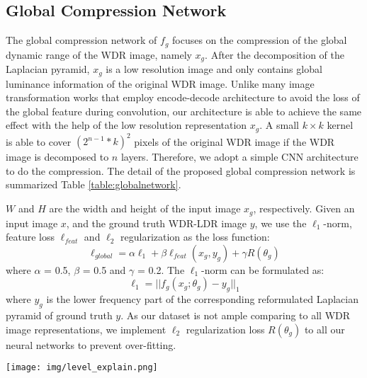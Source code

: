 \documentclass[journal]{IEEEtran}
\begin{document}
\subsection{Global Compression Network}
The global compression network of $f_g$ focuses on the compression of the global dynamic range of the WDR image, namely $x_g$. After the decomposition of the Laplacian pyramid, $x_g$ is a low resolution image and only contains global luminance information of the original WDR image. Unlike many image transformation works \cite{yang2018image,lee2018deep,cai2018learning} that employ encode-decode architecture to avoid the loss of the global feature during convolution, our architecture is able to achieve the same effect with the help of the low resolution representation $x_g$. A small $k \times k$ kernel is able to cover $(2^{n-1}*k)^2$ pixels of the original WDR image if the WDR image is decomposed to $n$ layers.
Therefore, we adopt a simple CNN architecture to do the compression. The detail of the proposed global compression network is summarized Table \ref{table:globalnetwork}.

$W$ and $H$ are the width and height of the input image $x_g$, respectively. 
Given an input image $x$, and the ground truth WDR-LDR image $y$, 
we use the $\ell_1$-norm, feature loss $\ell_{feat}$ and $\ell_2$ regularization as the loss function:
\begin{equation}
    \ell_{global} = \alpha \ell_1 +\beta \ell_{feat}(x_g, y_g) + \gamma R(\theta_g)
\end{equation}
where $\alpha$ = 0.5, $\beta$ = 0.5 and $\gamma$ = 0.2.  The $\ell_1$-norm can be formulated as:
\begin{equation}
    \ell_1 = ||f_g(x_g;\theta_g) - y_g||_1
\end{equation}
where $y_g$ is the lower frequency part of the corresponding reformulated Laplacian pyramid of ground truth $y$. As our dataset is not ample comparing to all WDR image representations, we implement $\ell_2$ regularization loss $R(\theta_g)$ to all our neural networks to prevent over-fitting. 


\begin{figure*}[tb]
\begin{center}
    \centering
    \texttt{[image: img/level\_explain.png]}
    \label{fig:level_explain}
\end{center}
\end{figure*}
\end{document}
